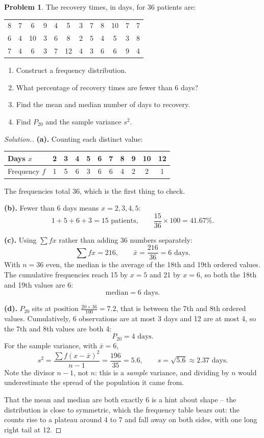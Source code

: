 \documentclass[11pt,a4paper]{article}
\theoremstyle{definition}
\newtheorem{problemx}{Problem}[section]
\newenvironment{problem}{\begin{problemx}}{\end{problemx}}
\newenvironment{solution}
  {\renewcommand{\qedsymbol}{}\begin{proof}[\textit{Solution}.]}
  {\end{proof}}
\begin{document}
\begin{problem}
The recovery times, in days, for 36 patients are:
\begin{center}
\begin{tabular}{cccccccccccc}
8 & 7 & 6 & 9 & 4 & 5 & 3 & 7 & 8 & 10 & 7 & 7\\
6 & 4 & 10 & 3 & 6 & 8 & 2 & 5 & 4 & 5 & 3 & 8\\
7 & 4 & 6 & 3 & 7 & 12 & 4 & 3 & 6 & 6 & 9 & 4\\
\end{tabular}
\end{center}
\begin{enumerate}
\item[(a).] Construct a frequency distribution.
\item[(b).] What percentage of recovery times are fewer than 6 days?
\item[(c).] Find the mean and median number of days to recovery.
\item[(d).] Find $P_{20}$ and the sample variance $s^{2}$.
\end{enumerate}
\end{problem}

\begin{solution}
\textbf{(a).} Counting each distinct value:
\begin{table}[H]
\centering
\begin{tabular}{lcccccccccc}
Days $x$      & 2 & 3 & 4 & 5 & 6 & 7 & 8 & 9 & 10 & 12\\
\hline
Frequency $f$ & 1 & 5 & 6 & 3 & 6 & 6 & 4 & 2 & 2 & 1\\
\end{tabular}
\end{table}
The frequencies total $36$, which is the first thing to check.

\textbf{(b).} Fewer than 6 days means $x = 2,3,4,5$:
\[1+5+6+3 = 15 \text{ patients}, \qquad \frac{15}{36}\times 100 = 41.67\%.\]

\textbf{(c).} Using $\sum fx$ rather than adding 36 numbers separately:
\[\sum fx = 216, \qquad \bar{x} = \frac{216}{36} = 6 \text{ days}.\]
With $n = 36$ even, the median is the average of the 18th and 19th ordered values. The
cumulative frequencies reach 15 by $x=5$ and 21 by $x=6$, so both the 18th and 19th values
are 6:
\[\text{median} = 6 \text{ days}.\]

\textbf{(d).} $P_{20}$ sits at position $\frac{20 \times 36}{100} = 7.2$, that is between
the 7th and 8th ordered values. Cumulatively, 6 observations are at most 3 days and 12 are
at most 4, so the 7th and 8th values are both 4:
\[P_{20} = 4 \text{ days}.\]
For the sample variance, with $\bar{x} = 6$,
\[s^{2} = \frac{\sum f(x-\bar{x})^{2}}{n-1} = \frac{196}{35} = 5.6,
\qquad s = \sqrt{5.6} \approx 2.37 \text{ days}.\]
Note the divisor $n-1$, not $n$: this is a \emph{sample} variance, and dividing by $n$
would underestimate the spread of the population it came from.

That the mean and median are both exactly 6 is a hint about shape -- the distribution is
close to symmetric, which the frequency table bears out: the counts rise to a plateau
around 4 to 7 and fall away on both sides, with one long right tail at 12.
\end{solution}
\end{document}
